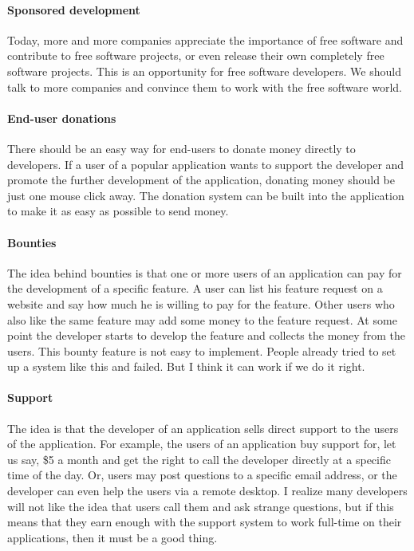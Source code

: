 \paragraph*{Sponsored development}

Today, more and more companies appreciate the importance of free software and
contribute to free software projects, or even release their own completely free
software projects. This is an opportunity for free software developers. We
should talk to more companies and convince them to work with the free software
world. 

\paragraph*{End-user donations}

There should be an easy way for end-users to donate money directly to
developers. If a user of a popular application wants to support the developer
and promote the further development of the application, donating money should be
just one mouse click away. The donation system can be built into the application
to make it as easy as possible to send money.

\paragraph*{Bounties}

The idea behind bounties is that one or more users of an application can pay for
the development of a specific feature. A user can list his feature request on a
website and say how much he is willing to pay for the feature. Other users who
also like the same feature may add some money to the feature request. At some
point the developer starts to develop the feature and collects the money from
the users. This bounty feature is not easy to implement. People already tried to
set up a system like this and failed. But I think it can work if we do it
right. 

\paragraph*{Support}

The idea is that the developer of an application sells direct support to the
users of the application. For example, the users of an application buy support
for, let us say, \$5 a month and get the right to call the developer directly at
a specific time of the day. Or, users may post questions to a specific email
address, or the developer can even help the users via a remote desktop. I
realize many developers will not like the idea that users call them and ask
strange questions, but if this means that they earn enough with the support
system to work full-time on their applications, then it must be a good thing.

